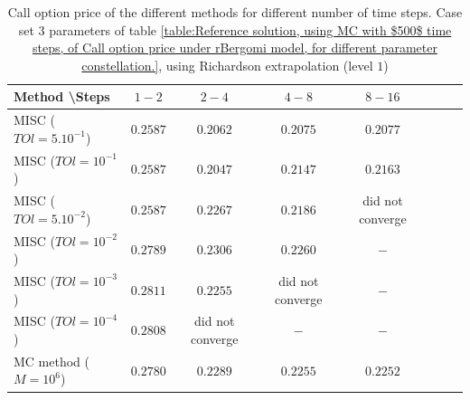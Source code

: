 \documentclass[11pt]{article}
\begin{document}
\begin{table}[h!]
	\centering
	\begin{tabular}{l*{6}{c}r}
		Method \textbackslash  Steps    &$1-2$         & $2-4$ & $4-8$ & $8-16$\\
		\hline
		MISC ($TOl=5.10^{-1}$)& $0.2587$  & $0.2062$ & $0.2075$ & $0.2077$ \\
		MISC ($TOl=10^{-1}$)  &$0.2587$  &$0.2047$ & $0.2147$ & $0.2163$  \\
		MISC ($TOl=5.10^{-2}$)  & $0.2587$ & $0.2267$ & $0.2186$ &did not converge  \\
		MISC ($TOl=10^{-2}$)  & $0.2789$ &$0.2306$ & $0.2260$ & $-$  \\
		MISC ($TOl=10^{-3}$)  & $0.2811$ &$0.2255$ & did not converge & $-$  \\
		MISC ($TOl=10^{-4}$)  & $0.2808$ &did not converge & $-$ & $-$  \\
		\hline
		MC method ($M=10^6$)  &$   0.2780$ & $0.2289$ & $ 0.2255$ & $0.2252$ \\
		\hline
	\end{tabular}
	\caption{Call option price of the different methods for different number of time steps. Case set $3$ parameters of table \ref{table:Reference solution, using MC with $500$ time steps, of Call option price under rBergomi model, for different parameter constellation.}, using Richardson extrapolation (level $1$)}
	\label{table:  Call option price of the different methods for different number of time steps. Case set $3$ parameter, using Richardson extrapolation (level $1$)}
\end{table}
\end{document}
